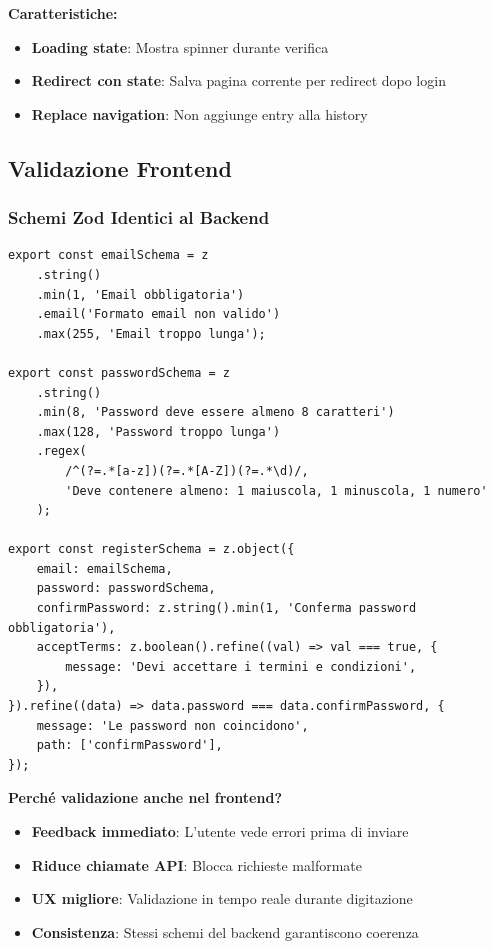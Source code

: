 \documentclass[11pt,a4paper]{article}
\begin{document}
\textbf{Caratteristiche:}
\begin{itemize}
    \item \textbf{Loading state}: Mostra spinner durante verifica
    \item \textbf{Redirect con state}: Salva pagina corrente per redirect dopo login
    \item \textbf{Replace navigation}: Non aggiunge entry alla history
\end{itemize}

\subsection{Validazione Frontend}

\subsubsection{Schemi Zod Identici al Backend}

\begin{lstlisting}[caption=Schema Zod Frontend]
export const emailSchema = z
    .string()
    .min(1, 'Email obbligatoria')
    .email('Formato email non valido')
    .max(255, 'Email troppo lunga');

export const passwordSchema = z
    .string()
    .min(8, 'Password deve essere almeno 8 caratteri')
    .max(128, 'Password troppo lunga')
    .regex(
        /^(?=.*[a-z])(?=.*[A-Z])(?=.*\d)/,
        'Deve contenere almeno: 1 maiuscola, 1 minuscola, 1 numero'
    );

export const registerSchema = z.object({
    email: emailSchema,
    password: passwordSchema,
    confirmPassword: z.string().min(1, 'Conferma password obbligatoria'),
    acceptTerms: z.boolean().refine((val) => val === true, {
        message: 'Devi accettare i termini e condizioni',
    }),
}).refine((data) => data.password === data.confirmPassword, {
    message: 'Le password non coincidono',
    path: ['confirmPassword'],
});
\end{lstlisting}

\textbf{Perché validazione anche nel frontend?}
\begin{itemize}
    \item \textbf{Feedback immediato}: L'utente vede errori prima di inviare
    \item \textbf{Riduce chiamate API}: Blocca richieste malformate
    \item \textbf{UX migliore}: Validazione in tempo reale durante digitazione
    \item \textbf{Consistenza}: Stessi schemi del backend garantiscono coerenza
\end{itemize}
\end{document}
